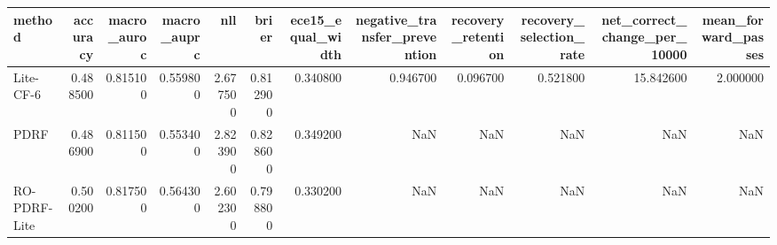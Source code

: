 \begin{tabular}{lrrrrrrrrrrr}
\toprule
method & accuracy & macro_auroc & macro_auprc & nll & brier & ece15_equal_width & negative_transfer_prevention & recovery_retention & recovery_selection_rate & net_correct_change_per_10000 & mean_forward_passes \\
\midrule
Lite-CF-6 & 0.488500 & 0.815100 & 0.559800 & 2.677500 & 0.812900 & 0.340800 & 0.946700 & 0.096700 & 0.521800 & 15.842600 & 2.000000 \\
PDRF & 0.486900 & 0.811500 & 0.553400 & 2.823900 & 0.828600 & 0.349200 & NaN & NaN & NaN & NaN & NaN \\
RO-PDRF-Lite & 0.500200 & 0.817500 & 0.564300 & 2.602300 & 0.798800 & 0.330200 & NaN & NaN & NaN & NaN & NaN \\
\bottomrule
\end{tabular}
